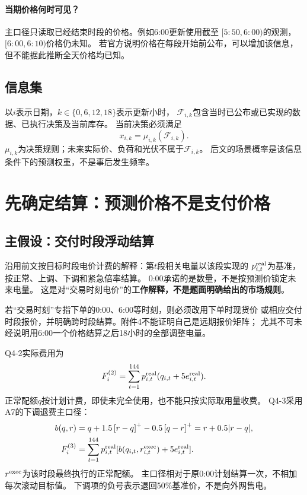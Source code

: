 \documentclass[UTF8,11pt]{ctexart}
\newcommand{\pos}[1]{\left[#1\right]^+}
\begin{document}
\paragraph{当期价格何时可见？}
主口径只读取已经结束时段的价格。例如6:00更新使用截至
$[5{:}50,6{:}00)$的观测，$[6{:}00,6{:}10)$价格仍未知。
若官方说明价格在每段开始前公布，可以增加该信息，
但不能据此推断全天价格均已知。

\subsection{信息集}
以$i$表示日期，$k\in\{0,6,12,18\}$表示更新小时，
$\mathcal F_{i,k}$包含当时已公布或已实现的数据、已执行决策及当前库存。
当前决策必须满足
\begin{equation}
 x_{i,k}=\mu_{i,k}(\mathcal F_{i,k}).
\end{equation}
$\mu_{i,k}$为决策规则；未来实际价、负荷和光伏不属于$\mathcal F_{i,k}$。
后文的场景概率是该信息条件下的预测权重，不是事后发生频率。

\section{先确定结算：预测价格不是支付价格}
\subsection{主假设：交付时段浮动结算}
沿用前文按目标时段电价计费的解释：第$t$段相关电量以该段实现的
$p^{\rm real}_{i,t}$为基准，按正常、上调、下调和紧急倍率结算。
0:00承诺的是数量，不是按预测价锁定未来电量。
这是对“交易时刻电价”的\textbf{工作解释，不是题面明确给出的市场规则}。

若“交易时刻”专指下单的0:00、6:00等时刻，则必须改用下单时现货价
或相应交付时段报价，并明确跨时段结算。附件4不能证明自己是远期报价矩阵；
尤其不可未经说明用6:00一个价格结算之后18小时的全部调整电量。

Q4-2实际费用为
\begin{equation}\label{eq:bill2}
 F_i^{(2)}=\sum_{t=1}^{144}p^{\rm real}_{i,t}
                  (q_{i,t}+5e^{\rm real}_{i,t}).
\end{equation}
正常配额$q$按计划计费，即使未完全使用，也不能只按实际取用量收费。
Q4-3采用A7的下调退费主口径：
\begin{align}
 b(q,r)&=q+1.5\pos{r-q}-0.5\pos{q-r}
              =r+0.5|r-q|,\label{eq:b}\\
 F_i^{(3)}&=\sum_{t=1}^{144}p^{\rm real}_{i,t}
   [b(q_{i,t},r^{\rm exec}_{i,t})+5e^{\rm real}_{i,t}].\label{eq:bill3}
\end{align}
$r^{\rm exec}$为该时段最终执行的正常配额。
主口径相对于原0:00计划结算一次，不相加每次滚动目标值。
下调项的负号表示退回50\%基准价，不是向外网售电。
\end{document}
